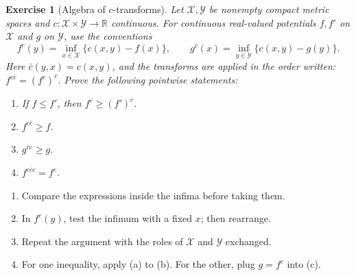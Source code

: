 \documentclass[11pt,a4paper]{article}
\theoremstyle{exostyle}
\newtheorem{exercise}{Exercise}
\newif\ifcorr
\newcommand{\R}{\mathbb{R}}
\newcommand{\X}{\mathcal X}
\newcommand{\Y}{\mathcal Y}
\begin{document}
\begin{exercise}[Algebra of $c$-transforms]\label{ex-dd-transforms}
Let $\X,\Y$ be nonempty compact metric spaces and
$c:\X\times\Y\to\R$ continuous. For continuous real-valued potentials
$f,f'$ on $\X$ and $g$ on $\Y$, use the conventions
\[
  f^c(y)=\inf_{x\in\X}\{c(x,y)-f(x)\},\qquad
  g^{\bar c}(x)=\inf_{y\in\Y}\{c(x,y)-g(y)\}.
\]
Here $\bar c(y,x)=c(x,y)$, and the transforms are applied in the order
written: $f^{c\bar c}=(f^c)^{\bar c}$.
Prove the following pointwise statements:
\begin{enumerate}[label=(\alph*)]
\item If $f\le f'$, then $f^c\ge(f')^c$.
\item $f^{c\bar c}\ge f$.
\item $g^{\bar c c}\ge g$.
\item $f^{c\bar c c}=f^c$.
\end{enumerate}
\end{exercise}
\begin{hints}
\begin{enumerate}[label=(\alph*)]
\item Compare the expressions inside the infima before taking them.
\item In $f^c(y)$, test the infimum with a fixed $x$; then rearrange.
\item Repeat the argument with the roles of $\X$ and $\Y$ exchanged.
\item For one inequality, apply (a) to (b). For the other, plug
  $g=f^c$ into (c).
\end{enumerate}
\end{hints}
\ifcorr\Needspace{12\baselineskip}\fi
\end{document}
